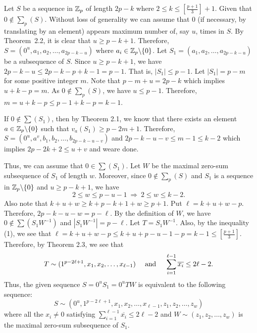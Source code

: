 \documentclass[fleqn]{mat01}
\begin{document}
\setcounter{theore}{0}
\begin{pot}{\rm
Let $S$ be a sequence in ${\Bbb Z}_p$ of length $2p-k$ where $2\leq
k\leq [\frac{p+1}3]+1$. Given that $0\not\in\sum_p(S)$. Without loss of
generality we can assume that $0$ (if necessary, by translating by an
element) appears maximum number of, say $u$, times in $S$. By
Theorem~2.2, it is clear that $u\geq p-k+1$. Therefore, $S =
(0^{u},a_1,a_2,\ldots,a_{2p-k-u})$ where $a_i\in {\Bbb Z}_p\backslash
\{0\}$. Let $S_1 = (a_1,a_2,\ldots,a_{2p-k-u})$ be a subsequence of $S$.
Since $u\geq p-k+1$, we have $2p - k -u\leq 2p -k-p+k-1 = p-1$. That is,
$|S_1|\leq p-1$. Let $|S_1| = p-m$ for some positive integer $m$. Note
that $p-m+u= 2p-k$ which implies $u+k-p = m$. As $0\not\in\sum_p(S)$, we
have $u\leq p-1$. Therefore, $m = u+k-p\leq p-1+k-p$\break $= k-1$.

If $0\not\in \sum(S_1)$, then by Theorem 2.1, we know that there exists
an element $a\in {\Bbb Z}_p\backslash\{0\}$ such that $v_a(S_1)\geq
p-2m+1$. Therefore, $S = (0^u,a^v, b_1,b_2,\ldots,b_{2p-k-u-v})$ and
$2p-k-u-v\leq m-1\leq k-2$ which implies $2p-2k+2\leq u+v$ and we\break are
done.

Thus, we can assume that $0\in\sum(S_1)$. Let $W$ be the maximal
zero-sum subsequence of $S_1$ of length $w$. Moreover, since $0\not\in
\sum_p(S)$ and $S_1$ is a sequence in ${\Bbb Z}_p\backslash\{0\}$ and $u\geq
p-k+1$, we have
\begin{equation}
2\leq w \leq  p-u-1 \ \Longrightarrow \ 2\leq w\leq k-2.
\end{equation}
Also note that $k+u+w \geq k+p-k+1+w\geq p+1$. Put $\ell = k+u+w -p$.
Therefore, $2p -k-u-w = p -\ell$. By the definition of $W$, we have
$0\not\in\sum(S_1W^{-1})$ and $|S_1W^{-1}| = p-\ell$. Let $T =
S_1W^{-1}$. Also, by the inequality (1), we see that $\ell = k+u+w-p
\leq k+u+p-u-1-p = k-1\leq \left[\frac{p+1}{3}\right]$. Therefore, by
Theorem 2.3, we see that
\begin{equation*}
T \sim (1^{p-2\ell+1},x_1,x_2,\ldots,x_{\ell-1}) \quad \hbox{ and }
\quad \sum_{i=1}^{\ell-1}\overline{x_i}\leq 2\ell -2.
\end{equation*}
Thus, the given sequence $S = 0^uS_1 = 0^uTW$ is equivalent to the
following sequence:
\begin{equation*}
S \sim (0^{u},1^{p-2\ell+1},x_1,x_2,\ldots,x_{\ell-1}, z_1, z_2, \ldots,
z_w)
\end{equation*}
where all the $x_i\ne 0$ satisfying
$\sum_{i=1}^{\ell-1}\overline{x_i}\leq 2\ell -2$ and $W \sim
(z_1,z_2,\ldots,z_w)$ is the maximal zero-sum subsequence of $S_1$.

}
\end{pot}
\end{document}
